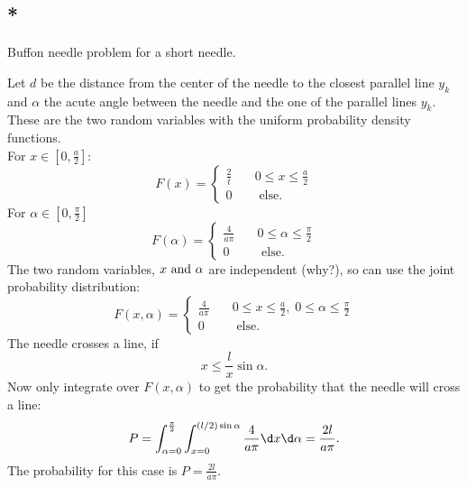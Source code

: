\subsection{*}
Buffon needle problem for a short needle.
\begin{solution}
	Let $d$ be the distance from the center of the needle to the closest parallel line $y_k$ and $\alpha$ the acute angle between the needle and the one of the parallel lines $y_k$. These are the two random variables with the uniform probability density functions.\\
	For $x\in [0,\frac{a}{2}]$:
	\[
		F(x) = \begin{cases}
		\frac{2}{t} \quad& 0 \le x \le \frac{a}{2}\\
		0 \quad & \text{ else}.
		\end{cases}
	\]
	For $\alpha \in [0,\frac{\pi}{2}]$
	\[
		F(\alpha) = \begin{cases}
		\frac{4}{a\pi} \quad& 0 \le \alpha \le \frac{\pi}{2}\\
		0 \quad & \text{ else}.
		\end{cases}
	\]
	The two random variables, $x \text{ and } \alpha$ are independent (why?), so can use the joint probability distribution:
	\[
		F(x,\alpha) = \begin{cases}
			\frac{4}{a\pi} \quad & 0 \le x \le \frac{a}{2},\;0\le \alpha \le \frac{\pi}{2}\\
			0 \quad & \text{ else}.
		\end{cases}
	\]
	The needle crosses a line, if
	\[
		x \le \frac{l}{x} \sin \alpha.
	\]
	Now only integrate over $F(x,\alpha)$ to get the probability that the needle will cross a line:
	\[
		P = \int_{\alpha = 0}^{\frac{\pi}{2}}\int_{x=0}^{(l/2)\sin \alpha} \frac{4}{a \pi} \d x \d \alpha = \frac{2l}{a \pi}.
	\] 
	The probability for this case is $P = \frac{2l}{a \pi}$.
\end{solution}